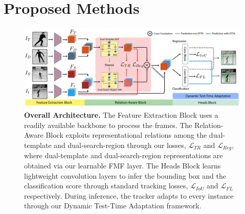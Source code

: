 \chapter{Proposed Methods} %

\label{Chapter4} %

\begin{figure}
  \centering
  \includegraphics[width=1.0\textwidth]{figures/main_figure.pdf}
   \caption{\textbf{Overall Architecture.} The Feature Extraction Block uses a readily available backbone to process the frames. The Relation-Aware Block exploits representational relations among the dual-template and dual-search-region through our losses, $\mathcal{L}_{TR}$ and $\mathcal{L}_{Reg}$, where dual-template and dual-search-region representations are obtained via our learnable FMF layer. The Heads Block learns lightweight convolution layers to infer the bounding box and the classification score through standard tracking losses, $\mathcal{L}_{IoU}$ and $\mathcal{L}_{FL}$ respectively. During inference, the tracker adapts to every instance through our Dynamic Test-Time Adaptation framework.}
   \label{fig:architecture}
\end{figure}


